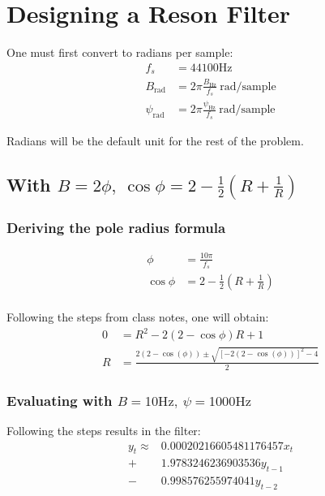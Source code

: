 \documentclass{article}
\begin{document}
\section{Designing a Reson Filter}
One must first convert to radians per sample:
\begin{align*}
	f_s                 & = 44100 \si{\hertz}                                               \\
	B_{\si{\radian}}    & = 2\pi \frac{B_{\si{\hertz}}}{f_s}\ \si{\radian}/\text{sample}    \\
	\psi_{\si{\radian}} & = 2\pi \frac{\psi_{\si{\hertz}}}{f_s}\ \si{\radian}/\text{sample}
\end{align*}

Radians will be the default unit for the rest of the problem.

\subsection{With $B = 2 \phi,\ \cos\phi = 2 - \frac{1}{2}(R + \frac{1}{R})$}
\subsubsection{Deriving the pole radius formula}
\begin{align*}
	\phi     & = \frac{10\pi}{f_s}                \\
	\cos\phi & = 2 - \frac{1}{2}(R + \frac{1}{R}) \\
\end{align*}

Following the steps from class notes, one will obtain:
\begin{align*}
	0 & =R^2 - 2(2 - \cos\phi)R + 1                                         \\
	R & = \frac{2(2 - \cos(\phi)) \pm \sqrt{[-2(2 - \cos(\phi))]^2 - 4}}{2}
\end{align*}

\subsubsection{Evaluating with $B = 10 \si{\hertz},\ \psi = 1000 \si{\hertz}$}
Following the steps results in the filter:
\begin{align*}
	y_t \approx & 0.00020216605481176457x_t \\
	+           & 1.9783246236903536y_{t-1} \\
	-           & 0.998576255974041y_{t-2}
\end{align*}
\end{document}
